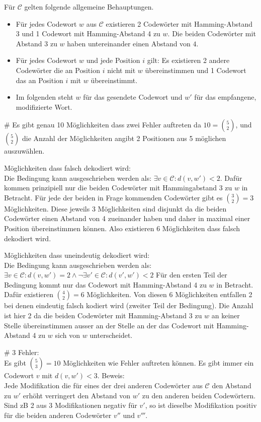 Für $\mathcal{C}$ gelten folgende allgemeine Behauptungen.
\begin{itemize}
	\item Für jedes Codewort $w$ aus $\mathcal{C}$ existieren 2 Codewörter mit Hamming-Abstand 3 und 1 Codewort mit Hamming-Abstand 4 zu $w$.
	Die beiden Codewörter mit Abstand 3 zu $w$ haben untereinander einen Abstand von $4$.
	\item Für jedes Codewort $w$ und jede Position $i$ gilt: Es existieren 2 andere Codewörter die an Position $i$ nicht mit $w$ übereinstimmen und 1 Codewort das an Position $i$ mit $w$ übereinstimmt.
	\item Im folgenden steht $w$ für das gesendete Codewort und $w'$ für das empfangene, modifizierte Wort.
\end{itemize}
\begin{myList}
#
Es gibt genau 10 Möglichkeiten dass zwei Fehler auftreten da $10 = \binom{5}{2}$, und $\binom{5}{2}$ die Anzahl der Möglichkeiten angibt 2 Positionen aus 5 möglichen auszuwählen.\medskip

Möglichkeiten dass falsch dekodiert wird:\\
Die Bedingung kann ausgeschrieben werden als: $\exists v \in \mathcal{C}: d(v,w') < 2$.
Dafür kommen prinzipiell nur die beiden Codewörter mit Hammingabstand 3 zu $w$ in Betracht.
Für jede der beiden in Frage kommenden Codewörter gibt es $\binom{3}{2} = 3$ Möglichkeiten.
Diese jeweils 3 Möglichkeiten sind disjunkt da die beiden Codewörter einen Abstand von 4 zueinander haben und daher in maximal einer Position übereinstimmen können.
Also existieren 6 Möglichkeiten dass falsch dekodiert wird.
\medskip

Möglichkeiten dass uneindeutig dekodiert wird:\\
Die Bedingung kann ausgeschrieben werden als: $\exists v \in \mathcal{C}: d(v,w') = 2 \wedge \neg \exists v' \in \mathcal{C}: d(v',w') < 2$
Für den ersten Teil der Bedingung kommt nur das Codewort mit Hamming-Abstand 4 zu $w$ in Betracht.
Dafür existieren $\binom{4}{2} = 6$ Möglichkeiten.
Von diesen 6 Möglichkeiten entfallen 2 bei denen eindeutig falsch kodiert wird (zweiter Teil der Bedingung).
Die Anzahl ist hier 2 da die beiden Codewörter mit Hamming-Abstand 3 zu $w$ an keiner Stelle übereinstimmen ausser an der Stelle an der das Codewort mit Hamming-Abstand 4 zu $w$ sich von $w$ unterscheidet.

#
3 Fehler:\\
Es gibt $\binom{5}{3} = 10$ Möglichkeiten wie Fehler auftreten können.
Es gibt immer ein Codewort $v$ mit $d(v,w') < 3$.
Beweis:\\
Jede Modifikation die für eines der drei anderen Codewörter aus $\mathcal{C}$ den Abstand zu $w'$ erhöht verringert den Abstand von $w'$ zu den anderen beiden Codewörtern.
Sind zB 2 aus 3 Modifikationen negativ für $v'$, so ist dieselbe Modifikation positiv für die beiden anderen Codewörter $v''$ und $v'''$.
\medskip


\end{myList}

